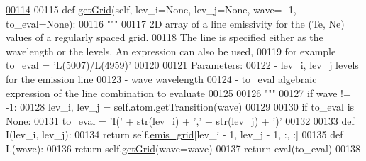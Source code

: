 \begin{DoxyCode}
\hypertarget{classpyneb_1_1core_1_1emis_grid_1_1_emis_grid_l00114}{}\hyperlink{classpyneb_1_1core_1_1emis_grid_1_1_emis_grid_af9a9219e5ddfcfd53c52466e2c2deb44}{00114} 
00115     \textcolor{keyword}{def }\hyperlink{classpyneb_1_1core_1_1emis_grid_1_1_emis_grid_af9a9219e5ddfcfd53c52466e2c2deb44}{getGrid}(self, lev\_i=None, lev\_j=None, wave= -1, to\_eval=None):
00116         \textcolor{stringliteral}{"""}
00117 \textcolor{stringliteral}{        2D array of a line emissivity for the (Te, Ne) values of a regularly spaced grid.}
00118 \textcolor{stringliteral}{        The line is specified either as the wavelength or the levels. An expression can also be used, }
00119 \textcolor{stringliteral}{        for example to\_eval = 'L(5007)/L(4959)'}
00120 \textcolor{stringliteral}{        }
00121 \textcolor{stringliteral}{        Parameters:}
00122 \textcolor{stringliteral}{            - lev\_i, lev\_j   levels for the emission line}
00123 \textcolor{stringliteral}{            - wave           wavelength}
00124 \textcolor{stringliteral}{            - to\_eval        algebraic expression of the line combination to evaluate}
00125 \textcolor{stringliteral}{        }
00126 \textcolor{stringliteral}{        """}
00127         \textcolor{keywordflow}{if} wave != -1:
00128             lev\_i, lev\_j = self.atom.getTransition(wave)
00129 
00130         \textcolor{keywordflow}{if} to\_eval \textcolor{keywordflow}{is} \textcolor{keywordtype}{None}:
00131             to\_eval = \textcolor{stringliteral}{'I('} + str(lev\_i) + \textcolor{stringliteral}{','} + str(lev\_j) + \textcolor{stringliteral}{')'}
00132             
00133         \textcolor{keyword}{def }I(lev\_i, lev\_j):
00134             \textcolor{keywordflow}{return} self.\hyperlink{classpyneb_1_1core_1_1emis_grid_1_1_emis_grid_a6fd6b209384aaa2cd4ba5051477e4ecb}{emis\_grid}[lev\_i - 1, lev\_j - 1, :, :]
00135         \textcolor{keyword}{def }L(wave):
00136             \textcolor{keywordflow}{return} self.\hyperlink{classpyneb_1_1core_1_1emis_grid_1_1_emis_grid_af9a9219e5ddfcfd53c52466e2c2deb44}{getGrid}(wave=wave)
00137         \textcolor{keywordflow}{return} eval(to\_eval)
00138     
    
\end{DoxyCode}
